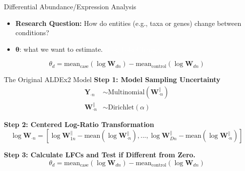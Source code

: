 \documentclass[
  ignorenonframetext,
]{beamer}
\providecommand{\tightlist}{%
  \setlength{\itemsep}{0pt}\setlength{\parskip}{0pt}}
\begin{document}
\begin{frame}{Differential Abundance/Expression Analysis}
\protect\hypertarget{differential-abundanceexpression-analysis}{}
\begin{itemize}
\tightlist
\item
  \textbf{Research Question:} How do entities (e.g., taxa or genes)
  change between conditions?
\end{itemize}

\vspace{.075in}

\begin{itemize}
\tightlist
\item
  \(\boldsymbol{\theta}\): what we want to estimate.
  \textcolor{white}{(Log Fold Change)}
\end{itemize}

\vspace{.075in}

\begin{equation*}
\theta_d = \text{mean}_{\text{case}}(\log \mathbf{W}_{dn}) - \text{mean}_{\text{control}}(\log \mathbf{W}_{dn})
\end{equation*}
\end{frame}

\begin{frame}{The Original ALDEx2 Model}
\protect\hypertarget{the-original-aldex2-model}{}
\textbf{Step 1: Model Sampling Uncertainty} \begin{align*}
\mathbf{Y}_{\cdot n} &\sim \text{Multinomial}(\mathbf{W}_{\cdot n}^\parallel)\\
\mathbf{W}_{\cdot n}^\parallel &\sim \text{Dirichlet}(\alpha)
\end{align*}

\textbf{Step 2: Centered Log-Ratio Transformation} \begin{equation*}
\log \mathbf{W}_{\cdot n} = \left[\log \mathbf{W}_{1n}^\parallel - \text{mean}(\log \mathbf{W}_{\cdot n}^\parallel), ..., \log \mathbf{W}_{Dn}^\parallel - \text{mean}(\log \mathbf{W}_{\cdot n}^\parallel) \right]
\end{equation*}

\textbf{Step 3: Calculate LFCs and Test if Different from Zero.}
\begin{equation*}
\theta_d = \text{mean}_{\text{case}}(\log \mathbf{W}_{dn}) - \text{mean}_{\text{control}}(\log \mathbf{W}_{dn})
\end{equation*}
\end{frame}
\end{document}
